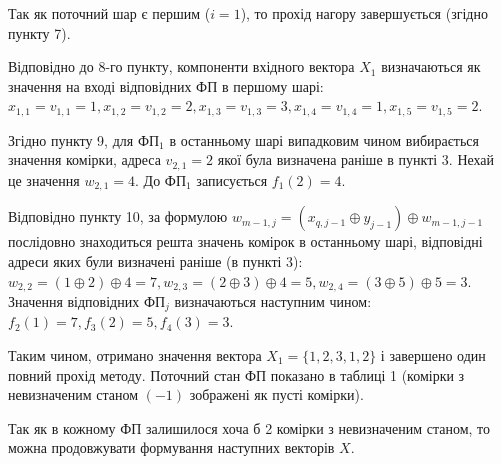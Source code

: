 \documentclass[12pt]{article}
\begin{document}
Так як поточний шар є першим ($i=1$), то прохід нагору завершується (згідно пункту 7).

Відповідно до 8-го пункту, компоненти вхідного вектора $X_1$ визначаються як значення на вході відповідних ФП в першому шарі: $x_{1,1}=v_{1,1}=1, x_{1,2}=v_{1,2}=2, x_{1,3}=v_{1,3}=3, x_{1,4}=v_{1,4}=1, x_{1,5}=v_{1,5}=2$.

Згідно пункту 9, для ФП$_1$ в останньому шарі випадковим чином вибирається значення комірки, адреса $v_{2,1}=2$ якої була визначена раніше в пункті 3. Нехай це значення $w_{2,1}=4$. До ФП$_1$ записується $f_1(2)=4$.

Відповідно пункту 10, за формулою $w_{m-1,j}=(x_{q,j-1} \oplus y_{j-1}) \oplus w_{m-1,j-1}$ послідовно знаходиться решта значень комірок в останньому шарі, відповідні адреси яких були визначені раніше (в пункті 3): $w_{2,2} = (1 \oplus 2) \oplus 4 = 7, w_{2,3} = (2 \oplus 3) \oplus 4 = 5, w_{2,4} = (3 \oplus 5) \oplus 5 = 3$. Значення відповідних ФП$_j$ визначаються наступним чином: $f_2(1)=7, f_3(2)=5, f_4(3)=3$.

Таким чином, отримано значення вектора $X_1=\{1,2,3,1,2\}$ і завершено один повний прохід методу. Поточний стан ФП показано в таблиці 1 (комірки з невизначеним станом $(-1)$ зображені як пусті комірки). %

Так як в кожному ФП залишилося хоча б 2 комірки з невизначеним станом, то можна продовжувати формування наступних векторів $X$.
\end{document}
